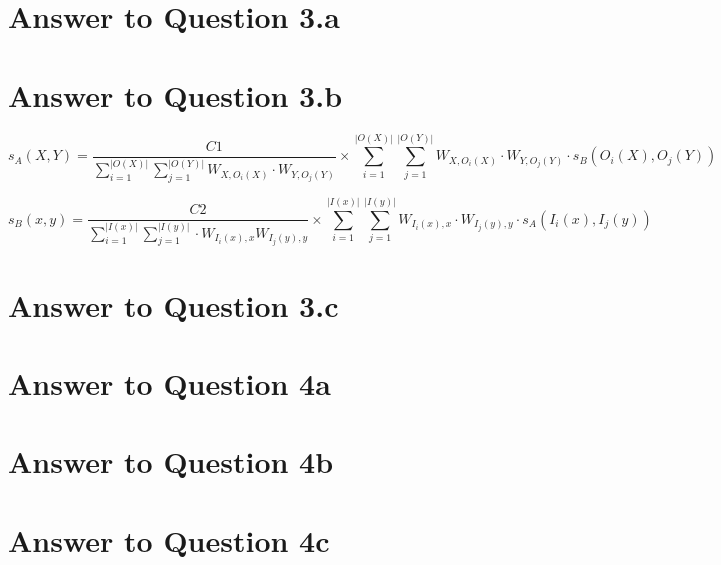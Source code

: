\documentclass[11pt]{article}
\begin{document}
{\pagebreak[4]
\section*{Answer to Question 3.a}

\pagebreak[4]
\section*{Answer to Question 3.b}

\setcounter{equation}{2}

\begin{small}
\begin{equation}
s_A (X, Y) = \dfrac{C1}{\sum_{i=1}^{|O(X)|} \sum_{j=1}^{|O(Y)|} W_{X, O_i(X)} \cdot W_{Y, O_j(Y)}} \times
\sum_{i=1}^{|O(X)|} \sum_{j=1}^{|O(Y)|} W_{X, O_i(X)} \cdot W_{Y, O_j(Y)} \cdot s_B(O_i(X), O_j (Y ))
\end{equation}
\end{small}

\begin{small}
\begin{equation}
s_B (x, y) = \dfrac{C2}{\sum_{i=1}^{|I(x)|} \sum_{j=1}^{|I(y)|} \cdot W_{I_i(x), x} W_{I_j(y), y}} \times
\sum_{i=1}^{|I(x)|} \sum_{j=1}^{|I(y)|} W_{I_i(x), x} \cdot W_{I_j(y), y} \cdot s_A(I_i(x), I_j (y ))
\end{equation}
\end{small}


\pagebreak[4]
\section*{Answer to Question 3.c}


\pagebreak[4]
\section*{Answer to Question 4a}


\pagebreak[4]
\section*{Answer to Question 4b}

\pagebreak[4]
\section*{Answer to Question 4c}


}
\end{document}
